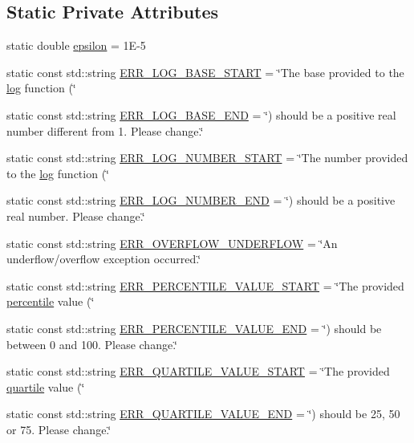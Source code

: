 \subsection*{Static Private Attributes}
\begin{DoxyCompactItemize}
\item 
static double \hyperlink{classmultiscale_1_1Numeric_ac66cc2092ff149af068ac93aa3a6cc51}{epsilon} = 1\-E-\/5
\item 
static const std\-::string \hyperlink{classmultiscale_1_1Numeric_a551052e6be615efea82ea046ba178010}{E\-R\-R\-\_\-\-L\-O\-G\-\_\-\-B\-A\-S\-E\-\_\-\-S\-T\-A\-R\-T} = \char`\"{}The base provided to the \hyperlink{classmultiscale_1_1Numeric_a27b50deac29d8aca5c41c8b19fba43e9}{log} function (\char`\"{}
\item 
static const std\-::string \hyperlink{classmultiscale_1_1Numeric_a291c98ea0c6e6c4042fe9ecc4af0443a}{E\-R\-R\-\_\-\-L\-O\-G\-\_\-\-B\-A\-S\-E\-\_\-\-E\-N\-D} = \char`\"{}) should be a positive real number different from 1. Please change.\char`\"{}
\item 
static const std\-::string \hyperlink{classmultiscale_1_1Numeric_a88ca9309ade745700dacbdc7c0d713f2}{E\-R\-R\-\_\-\-L\-O\-G\-\_\-\-N\-U\-M\-B\-E\-R\-\_\-\-S\-T\-A\-R\-T} = \char`\"{}The number provided to the \hyperlink{classmultiscale_1_1Numeric_a27b50deac29d8aca5c41c8b19fba43e9}{log} function (\char`\"{}
\item 
static const std\-::string \hyperlink{classmultiscale_1_1Numeric_a2f61b82d42049e175a8d34cd75966c6c}{E\-R\-R\-\_\-\-L\-O\-G\-\_\-\-N\-U\-M\-B\-E\-R\-\_\-\-E\-N\-D} = \char`\"{}) should be a positive real number. Please change.\char`\"{}
\item 
static const std\-::string \hyperlink{classmultiscale_1_1Numeric_aa56bde8322d97ccc99c252b951d44a9d}{E\-R\-R\-\_\-\-O\-V\-E\-R\-F\-L\-O\-W\-\_\-\-U\-N\-D\-E\-R\-F\-L\-O\-W} = \char`\"{}An underflow/overflow exception occurred.\char`\"{}
\item 
static const std\-::string \hyperlink{classmultiscale_1_1Numeric_a3bdb010188c74dc7570f950539df5e93}{E\-R\-R\-\_\-\-P\-E\-R\-C\-E\-N\-T\-I\-L\-E\-\_\-\-V\-A\-L\-U\-E\-\_\-\-S\-T\-A\-R\-T} = \char`\"{}The provided \hyperlink{classmultiscale_1_1Numeric_aff0c6b0c3d82bec3761a5e2d08394513}{percentile} value (\char`\"{}
\item 
static const std\-::string \hyperlink{classmultiscale_1_1Numeric_a0f89f3a8ecbc3709bac3f04b83819bf6}{E\-R\-R\-\_\-\-P\-E\-R\-C\-E\-N\-T\-I\-L\-E\-\_\-\-V\-A\-L\-U\-E\-\_\-\-E\-N\-D} = \char`\"{}) should be between 0 and 100. Please change.\char`\"{}
\item 
static const std\-::string \hyperlink{classmultiscale_1_1Numeric_ac76a6a6f1fa8abae2855f4fed0f0d97e}{E\-R\-R\-\_\-\-Q\-U\-A\-R\-T\-I\-L\-E\-\_\-\-V\-A\-L\-U\-E\-\_\-\-S\-T\-A\-R\-T} = \char`\"{}The provided \hyperlink{classmultiscale_1_1Numeric_a127a2b3e5e659b4e493767ba23fc45da}{quartile} value (\char`\"{}
\item 
static const std\-::string \hyperlink{classmultiscale_1_1Numeric_ac63a2d1c105ab47208d6c40827f9769c}{E\-R\-R\-\_\-\-Q\-U\-A\-R\-T\-I\-L\-E\-\_\-\-V\-A\-L\-U\-E\-\_\-\-E\-N\-D} = \char`\"{}) should be 25, 50 or 75. Please change.\char`\"{}
\end{DoxyCompactItemize}



